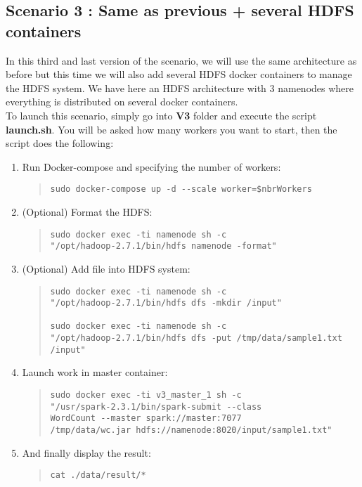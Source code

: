 \documentclass{article}
\begin{document}
\subsection{Scenario 3 : Same as previous + several HDFS containers}

In this third and last version of the scenario, we will use the same architecture as before but this time we will also add several HDFS docker containers to manage the HDFS system. We have here an HDFS architecture with 3 namenodes where everything is distributed on several docker containers.\\

\noindent To launch this scenario, simply go into \textbf{V3} folder and execute the script \textbf{launch.sh}. You will be asked how many workers you want to start, then the script does the following:
\begin{enumerate}
    \item Run Docker-compose and specifying the number of workers:
    \begin{quote}
\begin{verbatim}
sudo docker-compose up -d --scale worker=$nbrWorkers
\end{verbatim}
    \end{quote}
    
    \item (Optional) Format the HDFS:
    \begin{quote}
\begin{verbatim}
sudo docker exec -ti namenode sh -c 
"/opt/hadoop-2.7.1/bin/hdfs namenode -format"
\end{verbatim}
    \end{quote}
    
    \item (Optional) Add file into HDFS system:
    \begin{quote}
\begin{verbatim}
sudo docker exec -ti namenode sh -c 
"/opt/hadoop-2.7.1/bin/hdfs dfs -mkdir /input"

sudo docker exec -ti namenode sh -c 
"/opt/hadoop-2.7.1/bin/hdfs dfs -put /tmp/data/sample1.txt /input"
\end{verbatim}
    \end{quote}
    
    \item Launch work in master container:
    \begin{quote}
\begin{verbatim}
sudo docker exec -ti v3_master_1 sh -c 
"/usr/spark-2.3.1/bin/spark-submit --class 
WordCount --master spark://master:7077 
/tmp/data/wc.jar hdfs://namenode:8020/input/sample1.txt"
\end{verbatim}
    \end{quote}
    
    \item And finally display the result:
    \begin{quote}
\begin{verbatim}
cat ./data/result/*
\end{verbatim}
    \end{quote}
\end{enumerate}
\ \
\end{document}
